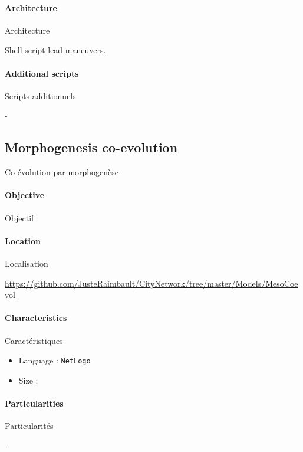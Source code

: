 \paragraph{Architecture}{Architecture}

Shell script lead maneuvers.

\paragraph{Additional scripts}{Scripts additionnels}

-






\subsection{Morphogenesis co-evolution}{Co-évolution par morphogenèse}

\paragraph{Objective}{Objectif}



\paragraph{Location}{Localisation}

\url{https://github.com/JusteRaimbault/CityNetwork/tree/master/Models/MesoCoevol}

\paragraph{Characteristics}{Caractéristiques}

\begin{itemize}
\item Language : \texttt{NetLogo}
\item Size : 
\end{itemize}


\paragraph{Particularities}{Particularités}

-

